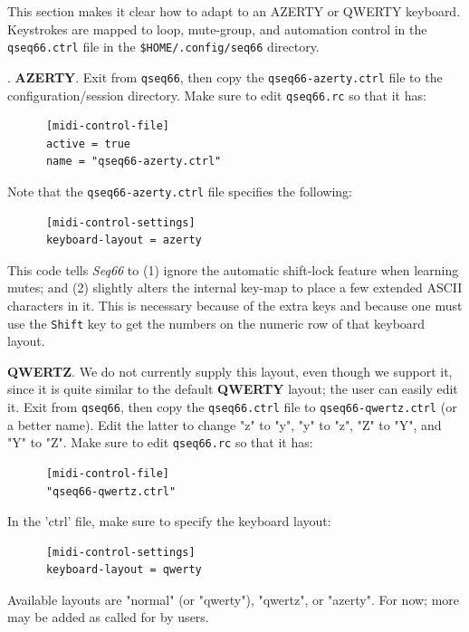    This section makes it clear how to adapt to an AZERTY or QWERTY keyboard.
   Keystrokes are mapped to loop, mute-group, and automation control in the
   \texttt{qseq66.ctrl} file in the \texttt{\$HOME/.config/seq66} directory.

   .
   \textbf{AZERTY}.
   Exit from \texttt{qseq66}, then copy the \texttt{qseq66-azerty.ctrl}
   file to the configuration/session directory.
   Make sure to edit \texttt{qseq66.rc} so that it has:

   \begin{verbatim}
      [midi-control-file]
      active = true
      name = "qseq66-azerty.ctrl"
   \end{verbatim}

   Note that the \texttt{qseq66-azerty.ctrl} file specifies the following:

   \begin{verbatim}
      [midi-control-settings]
      keyboard-layout = azerty
   \end{verbatim}

   This code tells \textsl{Seq66} to (1) ignore the automatic shift-lock
   feature when learning mutes; and (2) slightly alters the internal key-map to
   place a few extended ASCII characters in it.  This is necessary because of
   the extra keys and because one must use the
   \texttt{Shift} key to get the numbers on
   the numeric row of that keyboard layout.

   \textbf{QWERTZ}.
   We do not currently supply this layout, even though we support it, since it is
   quite similar to the default \textbf{QWERTY} layout;
   the user can easily edit it.
   Exit from \texttt{qseq66}, then copy the \texttt{qseq66.ctrl}
   file to \texttt{qseq66-qwertz.ctrl} (or a better name).  Edit the latter to
   change "z" to "y", "y" to "z", "Z" to "Y", and "Y" to "Z".
   Make sure to edit \texttt{qseq66.rc} so that it has:

   \begin{verbatim}
      [midi-control-file]
      "qseq66-qwertz.ctrl"
   \end{verbatim}

   In the 'ctrl' file, make sure to specify the keyboard layout:

   \begin{verbatim}
      [midi-control-settings]
      keyboard-layout = qwerty
   \end{verbatim}

   Available layouts are "normal" (or "qwerty"),
   "qwertz", or "azerty".  For now; more may be added as called for by users.

